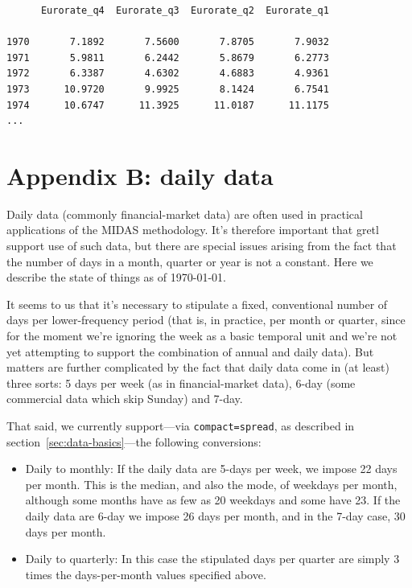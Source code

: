 \documentclass{article}
\begin{document}
{\small
\begin{verbatim}
      Eurorate_q4  Eurorate_q3  Eurorate_q2  Eurorate_q1

1970       7.1892       7.5600       7.8705       7.9032
1971       5.9811       6.2442       5.8679       6.2773
1972       6.3387       4.6302       4.6883       4.9361
1973      10.9720       9.9925       8.1424       6.7541
1974      10.6747      11.3925      11.0187      11.1175
...
\end{verbatim}
}

\clearpage

\section*{Appendix B: daily data}
\label{app:b}

Daily data (commonly financial-market data) are often used in practical
applications of the MIDAS methodology. It's therefore important that
gretl support use of such data, but there are special issues arising
from the fact that the number of days in a month, quarter or year is
not a constant. Here we describe the state of things as of \today.

It seems to us that it's necessary to stipulate a fixed, conventional
number of days per lower-frequency period (that is, in practice, per
month or quarter, since for the moment we're ignoring the week as a
basic temporal unit and we're not yet attempting to support the
combination of annual and daily data). But matters are further
complicated by the fact that daily data come in (at least) three
sorts: 5 days per week (as in financial-market data), 6-day (some
commercial data which skip Sunday) and 7-day.

That said, we currently support---via \texttt{compact=spread}, as
described in section~\ref{sec:data-basics}---the following
conversions:
\begin{itemize}
\item Daily to monthly: If the daily data are 5-days per week, we
  impose 22 days per month. This is the median, and also the mode, of
  weekdays per month, although some months have as few as 20 weekdays
  and some have 23. If the daily data are 6-day we impose
  26 days per month, and in the 7-day case, 30 days per month.

\item Daily to quarterly: In this case the stipulated days per quarter
  are simply 3 times the days-per-month values specified above.
\end{itemize}
\end{document}
